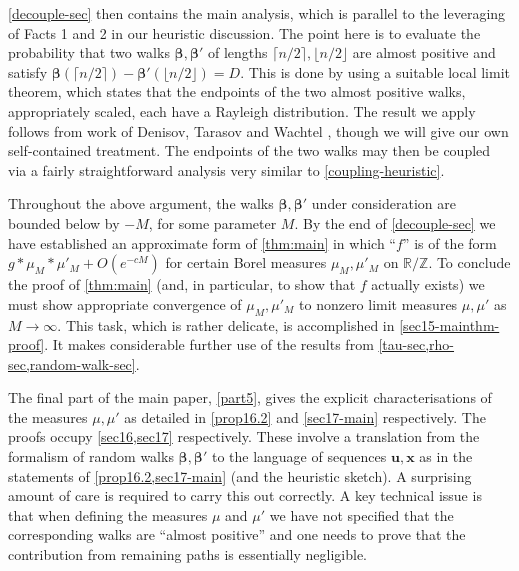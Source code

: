 \documentclass[11pt,reqno]{amsart}
\numberwithin{equation}{section}
\theoremstyle{definition}
\theoremstyle{remark}
\newcommand{\mbf}{\mathbf}
\def\boldbeta{\boldsymbol\beta}
\newcommand\Z{\mathbb{Z}}
\newcommand\R{\mathbb{R}}
\begin{document}
\cref{decouple-sec} then contains the main analysis, which is parallel to the leveraging of Facts 1 and 2 in our heuristic discussion. The point here is to evaluate the probability that two walks $\boldbeta, \boldbeta'$ of lengths $\lceil n/2\rceil,\lfloor n/2\rfloor$ are almost positive and satisfy $\boldbeta(\lceil n/2\rceil) - \boldbeta'(\lfloor n/2\rfloor) = D$. This is done by using a suitable local limit theorem, which states that the endpoints of the two almost positive walks, appropriately scaled, each have a Rayleigh distribution. The result we apply follows from work of Denisov, Tarasov and Wachtel \cite{DTW24b}, though we will give our own self-contained treatment. The endpoints of the two walks may then be coupled via a fairly straightforward analysis very similar to \cref{coupling-heuristic}.

Throughout the above argument, the walks $\boldbeta, \boldbeta'$ under consideration are bounded below by $-M$, for some parameter $M$. By the end of \cref{decouple-sec} we have established an approximate form of \cref{thm:main} in which ``$f$'' is of the form $g \ast \mu_M \ast \mu'_{M} + O(e^{-cM})$ for certain Borel measures $\mu_M, \mu'_M$ on $\R/\Z$.  To conclude the proof of \cref{thm:main} (and, in particular, to show that $f$ actually exists) we must show appropriate convergence of $\mu_M, \mu'_M$ to nonzero limit measures $\mu, \mu'$ as $M \rightarrow \infty$. This task, which is rather delicate, is accomplished in \cref{sec15-mainthm-proof}. It makes considerable further use of the results from \cref{tau-sec,rho-sec,random-walk-sec}.\vspace*{10pt}

The final part of the main paper, \cref{part5}, gives the explicit characterisations of the measures $\mu, \mu'$ as detailed in \cref{prop16.2} and \cref{sec17-main} respectively. The proofs occupy \cref{sec16,sec17} respectively. These involve a translation from the formalism of random walks $\boldbeta, \boldbeta'$ to the language of sequences $\mbf{u}, \mbf{x}$ as in the statements of \cref{prop16.2,sec17-main} (and the heuristic sketch). A surprising amount of care is required to carry this out correctly. A key technical issue is that when defining the measures $\mu$ and $\mu'$ we have not specified that the corresponding walks are ``almost positive'' and one needs to prove that the contribution from remaining paths is essentially negligible. \vspace*{10pt}
\end{document}

